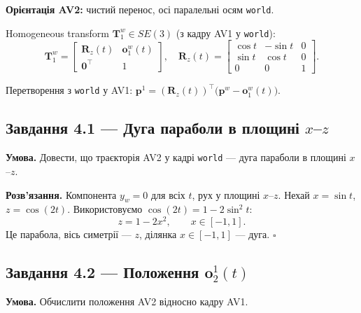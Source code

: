 \documentclass[11pt,a4paper]{article}
\begin{document}
\textbf{Орієнтація AV2:} чистий перенос, осі паралельні осям \texttt{world}.

Homogeneous transform $\bm{T}_1^w \in SE(3)$ (з кадру AV1 у \texttt{world}):
\begin{equation}
  \bm{T}_1^w =
  \begin{bmatrix}
    \bm{R}_z(t) & \bm{o}_1^w(t) \\
    \bm{0}^\top & 1
  \end{bmatrix},
  \quad
  \bm{R}_z(t) =
  \begin{bmatrix}
    \cos t & -\sin t & 0 \\
    \sin t & \cos t & 0 \\
    0 & 0 & 1
  \end{bmatrix}.
\end{equation}

Перетворення з \texttt{world} у AV1: $\bm{p}^1 = (\bm{R}_z(t))^\top\bigl(\bm{p}^w - \bm{o}_1^w(t)\bigr)$.

\subsection{Завдання 4.1 --- Дуга параболи в площині $x$--$z$}

\textbf{Умова.} Довести, що траєкторія AV2 у кадрі \texttt{world} --- дуга параболи в площині $x$--$z$.

\textbf{Розв'язання.}
Компонента $y_w = 0$ для всіх $t$, рух у площині $x$--$z$.
Нехай $x = \sin t$, $z = \cos(2t)$. Використовуємо $\cos(2t) = 1 - 2\sin^2 t$:
\begin{equation}
  z = 1 - 2 x^2, \qquad x \in [-1,1].
\end{equation}
Це парабола, вісь симетрії --- $z$, ділянка $x\in[-1,1]$ --- дуга. \hfill$\square$

\subsection{Завдання 4.2 --- Положення \texorpdfstring{$\bm{o}_2^1(t)$}{o2^1(t)}}

\textbf{Умова.} Обчислити положення AV2 відносно кадру AV1.
\end{document}
